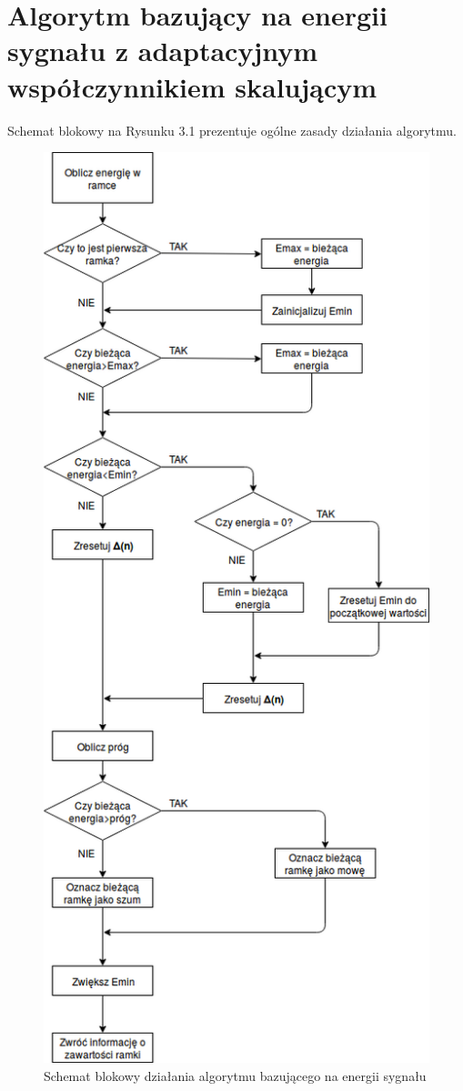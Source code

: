 \documentclass[eng,printmode]{mgr}
\begin{document}
	 
 \section{Algorytm bazujący na energii sygnału z adaptacyjnym współczynnikiem skalującym }
 Schemat blokowy na Rysunku 3.1 prezentuje ogólne zasady działania algorytmu.
 
 \begin{figure}
	 \begin{center}
	 	\includegraphics[scale=0.6]{EnergyBasedAlgorithmFlowchart.png}
	 	\caption{Schemat blokowy działania algorytmu bazującego na energii sygnału} 	
	 \end{center}
 \end{figure}
 
\end{document}
